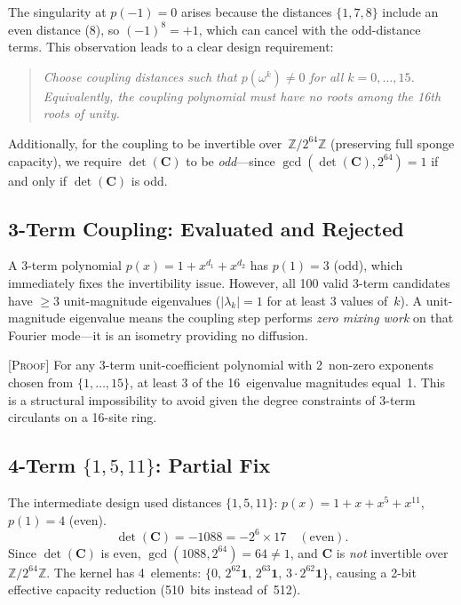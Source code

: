 \documentclass[runningheads]{llncs}
\newcommand{\proof}[1]{\textsc{[Proof]} #1}
\newcommand{\Ztwo}{\mathbb{Z}/2^{64}\mathbb{Z}}
\newcommand{\coupmat}{\mathbf{C}}
\begin{document}
The singularity at $p(-1) = 0$ arises because the distances $\{1,7,8\}$
include an even distance (8), so $(-1)^8 = +1$, which can cancel with the
odd-distance terms.  This observation leads to a clear design requirement:

\begin{quote}
\emph{Choose coupling distances such that $p(\omega^k) \neq 0$ for all
$k = 0, \ldots, 15$.  Equivalently, the coupling polynomial must have no roots
among the 16th roots of unity.}
\end{quote}

Additionally, for the coupling to be invertible over~$\Ztwo$ (preserving full
sponge capacity), we require $\det(\coupmat)$ to be \emph{odd}---since
$\gcd(\det(\coupmat), 2^{64}) = 1$ if and only if $\det(\coupmat)$ is odd.

\subsection{3-Term Coupling: Evaluated and Rejected}

A 3-term polynomial $p(x) = 1 + x^{d_1} + x^{d_2}$ has $p(1) = 3$ (odd),
which immediately fixes the invertibility issue.  However, all 100 valid 3-term
candidates have $\geq 3$ unit-magnitude eigenvalues ($|\lambda_k| = 1$ for at
least 3 values of~$k$).  A unit-magnitude eigenvalue means the coupling step
performs \emph{zero mixing work} on that Fourier mode---it is an isometry
providing no diffusion.

\proof{For any 3-term unit-coefficient polynomial with 2~non-zero exponents chosen
from $\{1, \ldots, 15\}$, at least 3 of the 16~eigenvalue magnitudes equal~1.
This is a structural impossibility to avoid given the degree constraints of
3-term circulants on a 16-site ring.}

\subsection{4-Term \texorpdfstring{$\{1,5,11\}$}{1,5,11}: Partial Fix}

The intermediate design used distances $\{1,5,11\}$:
$p(x) = 1 + x + x^5 + x^{11}$, $p(1) = 4$ (even).
\[
  \det(\coupmat) = -1088 = -2^6 \times 17 \quad (\text{even}).
\]
Since $\det(\coupmat)$ is even, $\gcd(1088, 2^{64}) = 64 \neq 1$, and $\coupmat$
is \emph{not} invertible over~$\Ztwo$.  The kernel has 4~elements:
$\{0,\, 2^{62}\mathbf{1},\, 2^{63}\mathbf{1},\, 3 \cdot 2^{62}\mathbf{1}\}$,
causing a 2-bit effective capacity reduction (510~bits instead of~512).
\end{document}
